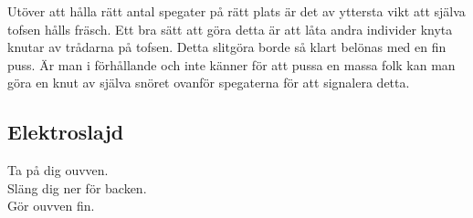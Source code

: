 Utöver att hålla rätt antal spegater på rätt plats är det av yttersta vikt att själva tofsen hålls fräsch. Ett bra sätt att göra detta är att låta andra individer knyta knutar av trådarna på tofsen. Detta slitgöra borde så klart belönas med en fin puss.
Är man i förhållande och inte känner för att pussa en massa folk kan man göra en knut av själva snöret ovanför spegaterna för att signalera detta.
\\

\subsection*{Elektroslajd}
Ta på dig ouvven.\\
Släng dig ner för backen.\\
Gör ouvven fin.

\newpage










